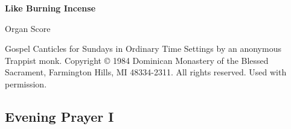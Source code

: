 \documentclass{lbi_cantor_bind}
\begin{document}
\thispagestyle{empty}

\begin{center}
    \null\vfill
    \Large\bfseries
    Like Burning Incense

    \normalfont\Large
    \vspace{2\baselineskip}Organ Score

    \vspace{1\baselineskip}Gospel Canticles for Sundays in Ordinary Time
    \vfill\vfill\vfill
    \small
    Settings by an anonymous Trappist monk. Copyright © 1984 Dominican Monastery of the Blessed Sacrament, Farmington Hills, MI 48334-2311. All rights reserved. Used with permission.
\end{center}

\newpage



\newpage\null\newpage

\subsection{Evening Prayer I}

% 
% 
\end{document}
